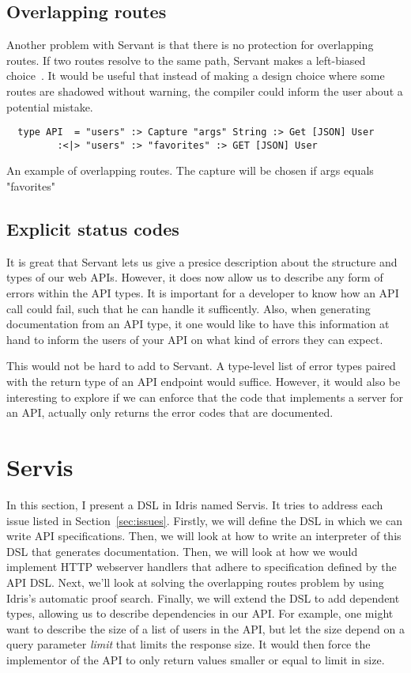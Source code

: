 \documentclass[12pt,a4paper]{article}
\begin{document}
\subsection{Overlapping routes}
Another problem with Servant is that there is no protection for overlapping routes.
If two routes resolve to the same path, Servant makes a left-biased choice~\cite{servant}.
It would be useful that instead of making a design choice where some routes are shadowed without warning, the compiler could inform the user about a potential mistake.

\begin{listing}
\begin{verbatim}
  type API  = "users" :> Capture "args" String :> Get [JSON] User
         :<|> "users" :> "favorites" :> GET [JSON] User
\end{verbatim}
\caption{An example of overlapping routes. The capture will be chosen if args equals "favorites"}
\end{listing}

\subsection{Explicit status codes}
It is great that Servant lets us give a presice description about the structure and types of our web APIs. However, it does now allow us to describe any form of errors within the API types.
It is important for a developer to know how an API call could fail, such that he can handle it sufficently. Also, when generating documentation from an API type, it one would like to have this information at hand to inform the users of your API on what kind of errors they can expect.

This would not be hard to add to Servant. A type-level list of error types paired with the return type of an API endpoint would suffice. However, it would also be interesting to explore if we can enforce that the code that implements a server for an API, actually only returns the error codes that are documented.

\section{Servis}
In this section, I present a DSL in Idris named Servis.
It tries to address each issue listed in Section~\ref{sec:issues}.
Firstly, we will define the DSL in which we can write API specifications. Then, we will look at how to write an interpreter of this DSL that generates documentation.
Then, we will look at how we would implement HTTP webserver handlers that adhere to specification defined by the API DSL\@.
Next, we'll look at solving the overlapping routes problem by using Idris's automatic proof search.
Finally, we will extend the DSL to add dependent types, allowing us to describe dependencies in our API\@.
For example, one might want to describe  the size of a list of users in the API, but let the size depend on a query parameter \emph{limit} that limits the response size.  It would then force the implementor of the API to only return values smaller or equal to limit in size.
\end{document}

